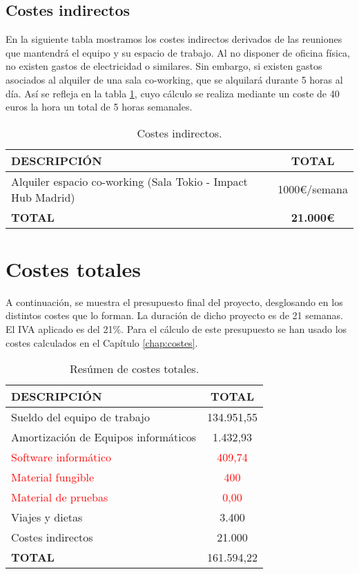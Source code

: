 \subsection{Costes indirectos}
En la siguiente tabla mostramos los costes indirectos derivados de las reuniones que mantendrá el equipo y su espacio de trabajo. Al no disponer de oficina física, no existen gastos de electricidad o similares. Sin embargo, si existen gastos asociados al alquiler de una sala co-working, que se alquilará durante 5 horas al día. Así se refleja en la tabla \ref{tab:indirectos}, cuyo cálculo se realiza mediante un coste de 40 euros la hora un total de 5 horas semanales.

\begin{table}[H]
\begin{center}
\begin{tabular}{l c}
\textbf{DESCRIPCIÓN} & \textbf{TOTAL}\\ \hline \hline
Alquiler espacio co-working (Sala Tokio - Impact Hub Madrid) & 1000\euro/semana\\ \hline \hline
\textbf{TOTAL} & \textbf{21.000\euro}\\ \hline
\end{tabular}
\caption{Costes indirectos.}
\label{tab:indirectos}
\end{center}
\end{table}


\section{Costes totales}
\par A continuación, se muestra el presupuesto final del proyecto, desglosando en los distintos costes que lo forman. La duración de dicho proyecto es de 21 semanas. El IVA aplicado es del 21\%. Para el cálculo de este presupuesto se han usado los costes calculados en el Capítulo \ref{chap:costes}.

\begin{table}[H]
\begin{center}
\begin{tabular}{l c}
\textbf{DESCRIPCIÓN} & \textbf{TOTAL}\\ \hline \hline
Sueldo del equipo de trabajo & 134.951,55\\
Amortización de Equipos informáticos & 1.432,93\\
\textcolor{red}{Software informático} & \textcolor{red}{409,74}\\
\textcolor{red}{Material fungible} & \textcolor{red}{400}\\
\textcolor{red}{Material de pruebas} & \textcolor{red}{0,00}\\
Viajes y dietas & 3.400\\
Costes indirectos & 21.000\\ \hline \hline
\textbf{TOTAL} & 161.594,22\\ \hline
\end{tabular}
\caption{Resúmen de costes totales.}
\label{tab:resumenTotal}
\end{center}
\end{table}


